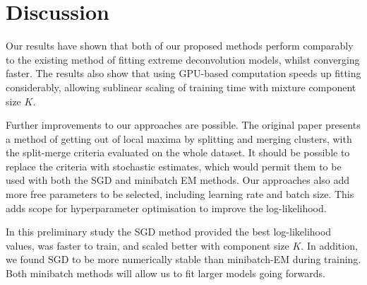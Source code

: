 \section{Discussion}

Our results have shown that both of our proposed methods perform comparably to the existing method of fitting extreme deconvolution models, whilst converging faster.
The results also show that using GPU-based computation speeds up fitting considerably, allowing sublinear scaling of training time with mixture component size $K$.


Further improvements to our approaches are possible.
The original paper presents a method of getting out of local maxima by splitting and merging clusters, with the split-merge criteria evaluated on the whole dataset.
It should be possible to replace the criteria with stochastic estimates, which would permit them to be used with both the SGD and minibatch EM methods.
Our approaches also add more free parameters to be selected, including learning rate and batch size.
This adds scope for hyperparameter optimisation to improve the log-likelihood.

In this preliminary study the SGD method provided the best log-likelihood values, was faster to train, and scaled better with component size $K$.
In addition, we found SGD to be more numerically stable than minibatch-EM during training.
Both minibatch methods will allow us to fit larger models going forwards.
